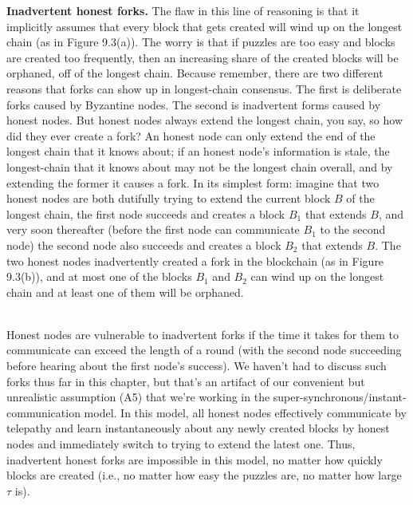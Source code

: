 \noindent
\textbf{Inadvertent honest forks.} The flaw in this line of reasoning is that it implicitly assumes
that every block that gets created will wind up on the longest chain (as in Figure 9.3(a)). The worry is that if puzzles are too easy and blocks are created too frequently,
then an increasing share of the created blocks will be orphaned, off of the longest chain.
Because remember, there are two different reasons that forks can show up in longest-chain
consensus. The first is deliberate forks caused by Byzantine nodes. The second is inadvertent forms caused by honest nodes. But honest nodes always extend the longest chain, you
say, so how did they ever create a fork? An honest node can only extend the end of the longest
chain that it knows about; if an honest node’s information is stale, the longest-chain that it
knows about may not be the longest chain overall, and by extending the former it causes a
fork. In its simplest form: imagine that two honest nodes are both dutifully trying to extend
the current block $B$ of the longest chain, the first node succeeds and creates a block $B_1$ that
extends $B$, and very soon thereafter (before the first node can communicate $B_1$ to the second
node) the second node also succeeds and creates a block $B_2$ that extends $B$. The two honest
nodes inadvertently created a fork in the blockchain (as in Figure 9.3(b)), and at most one
of the blocks $B_1$ and $B_2$ can wind up on the longest chain and at least one of them will be
orphaned.\\
\begin{figure}[h]
    \centering
    \qquad
    \caption{}
    \label{fig:example}%
\end{figure}\\

Honest nodes are vulnerable to inadvertent forks if the time it takes for them to communicate can exceed the length of a round (with the second node succeeding before hearing
about the first node’s success). We haven’t had to discuss such forks thus far in this chapter,
but that’s an artifact of our convenient but unrealistic assumption (A5) that we’re working
in the super-synchronous/instant-communication model. In this model, all honest nodes
effectively communicate by telepathy and learn instantaneously about any newly created
blocks by honest nodes and immediately switch to trying to extend the latest one. Thus,
inadvertent honest forks are impossible in this model, no matter how quickly blocks are
created (i.e., no matter how easy the puzzles are, no matter how large $\tau$ is).\\

